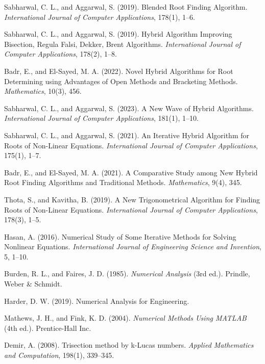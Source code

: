 \documentclass[amsmath, amssymb, aps]{revtex4-2}
\begin{document}
\begin{thebibliography}{99}

Sabharwal, C. L., and Aggarwal, S. (2019). Blended Root Finding Algorithm. \textit{International Journal of Computer Applications}, 178(1), 1--6.

Sabharwal, C. L., and Aggarwal, S. (2019). Hybrid Algorithm Improving Bisection, Regula Falsi, Dekker, Brent Algorithms. \textit{International Journal of Computer Applications}, 178(2), 1--8.

Badr, E., and El-Sayed, M. A. (2022). Novel Hybrid Algorithms for Root Determining using Advantages of Open Methods and Bracketing Methods. \textit{Mathematics}, 10(3), 456.

Sabharwal, C. L., and Aggarwal, S. (2023). A New Wave of Hybrid Algorithms. \textit{International Journal of Computer Applications}, 181(1), 1--10.

Sabharwal, C. L., and Aggarwal, S. (2021). An Iterative Hybrid Algorithm for Roots of Non-Linear Equations. \textit{International Journal of Computer Applications}, 175(1), 1--7.

Badr, E., and El-Sayed, M. A. (2021). A Comparative Study among New Hybrid Root Finding Algorithms and Traditional Methods. \textit{Mathematics}, 9(4), 345.

Thota, S., and Kavitha, B. (2019). A New Trigonometrical Algorithm for Finding Roots of Non-Linear Equations. \textit{International Journal of Computer Applications}, 178(3), 1--5.

Hasan, A. (2016). Numerical Study of Some Iterative Methods for Solving Nonlinear Equations. \textit{International Journal of Engineering Science and Invention}, 5, 1--10.

Burden, R. L., and Faires, J. D. (1985). \textit{Numerical Analysis} (3rd ed.). Prindle, Weber \& Schmidt.

Harder, D. W. (2019). Numerical Analysis for Engineering. 

Mathews, J. H., and Fink, K. D. (2004). \textit{Numerical Methods Using MATLAB} (4th ed.). Prentice-Hall Inc.

Demir, A. (2008). Trisection method by k-Lucas numbers. \textit{Applied Mathematics and Computation}, 198(1), 339--345.


\end{thebibliography}
\end{document}

